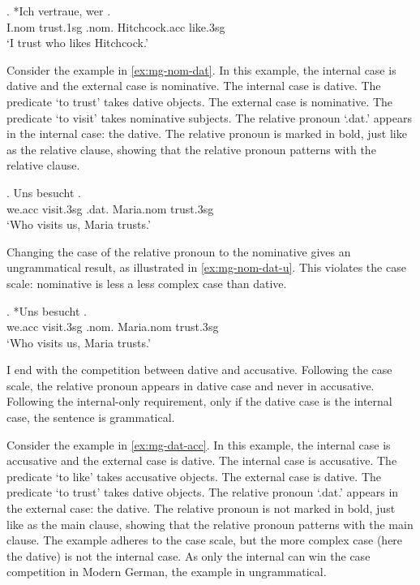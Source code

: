 \exg. *Ich vertraue, wer  .\\
I.\ac{nom} trust.1\ac{sg}\scsub{[dat]} .\ac{nom}. Hitchcock.\ac{acc} like.3\ac{sg}\scsub{[nom]}\\
`I trust who likes Hitchcock.' \label{ex:mg-dat-nom-u}

Consider the example in \ref{ex:mg-nom-dat}. In this example, the internal case is dative and the external case is nominative.
The internal case is dative. The predicate  `to trust' takes dative objects.
The external case is nominative. The predicate  `to visit' takes nominative subjects.
The relative pronoun  `.\ac{dat}.' appears in the internal case: the dative. The relative pronoun is marked in bold, just like as the relative clause, showing that the relative pronoun patterns with the relative clause.

\exg. Uns besucht   .\\
we.\ac{acc} visit.3\ac{sg}\scsub{[nom]} .\ac{dat}. Maria.\ac{nom} trust.3\ac{sg}\scsub{[dat]}\\
`Who visits us, Maria trusts.' \label{ex:mg-nom-dat}

Changing the case of the relative pronoun to the nominative gives an ungrammatical result, as illustrated in \ref{ex:mg-nom-dat-u}. This violates the case scale: nominative is less a less complex case than dative.

\exg. *Uns besucht   .\\
we.\ac{acc} visit.3\ac{sg}\scsub{[nom]} .\ac{nom}. Maria.\ac{nom} trust.3\ac{sg}\scsub{[dat]}\\
`Who visits us, Maria trusts.' \label{ex:mg-nom-dat-u}

I end with the competition between dative and accusative. Following the case scale, the relative pronoun appears in dative case and never in accusative. Following the internal-only requirement, only if the dative case is the internal case, the sentence is grammatical.

Consider the example in \ref{ex:mg-dat-acc}. In this example, the internal case is accusative and the external case is dative.
The internal case is accusative. The predicate  `to like' takes accusative objects.
The external case is dative. The predicate  `to trust' takes dative objects.
The relative pronoun  `.\ac{dat}.' appears in the external case: the dative. The relative pronoun is not marked in bold, just like as the main clause, showing that the relative pronoun patterns with the main clause.
The example adheres to the case scale, but the more complex case (here the dative) is not the internal case. As only the internal can win the case competition in Modern German, the example in ungrammatical.

